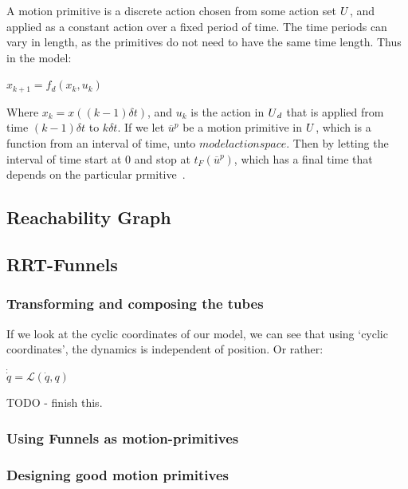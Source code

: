 A motion primitive is a discrete action chosen from some action set
\(U{}\), and applied as a constant action over a fixed period of
time. The time periods can vary in length, as the primitives do not need to have
the same time length. Thus in the model:

\begin{math}
  x_{k+1} = f_d(x_k,u_k)
\end{math} 

Where \(x_k = x((k-1)\delta{}t)\), and \(u_k\) is the action in
\(U{}_d\) that is applied from time \((k-1)\delta{}t\) to
\(k\delta{}t\). If we let \(\overline{u}^p\) be a motion primitive in
\(U{}\), which is a function from an interval of time, unto
\(modelactionspace{}\). Then by letting the interval of time start at 0 and stop
at \(t_F(\overline{u}^p)\), which has a final time that depends on the
particular prmitive~\cite{Lav06}.


\subsection{Reachability Graph}

\subsection{RRT-Funnels}


\subsubsection{Transforming and composing the tubes}

If we look at the cyclic coordinates of our model, we can see that using `cyclic
coordinates', the dynamics is independent of position. Or rather:

\begin{math}
  \dot{\dot{q}} = \mathcal{L}(\dot{q},q)
\end{math}

TODO - finish this.


\subsubsection{Using Funnels as motion-primitives}

\subsubsection{Designing good motion primitives}